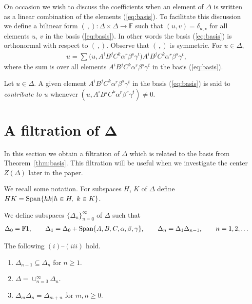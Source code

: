  On occasion we
wish to discuss the coef\/f\/icients
when an element of $\Delta$ is written as a linear
combination of the elements
(\ref{eq:basis}). To facilitate this discussion
we def\/ine a bilinear form
$(\,,) : \Delta \times \Delta \to \mathbb F$
such that $( u,v) = \delta_{u,v}$
for all elements $u$, $v$ in the basis
(\ref{eq:basis}). In other words
the basis
(\ref{eq:basis}) is
orthonormal with respect to
$( \,,) $.
 Observe that
$(\,,)$ is symmetric.
For $u \in \Delta$,
\begin{gather}
u = \sum \big(u, A^iB^jC^k\alpha^r\beta^s\gamma^t \big)
 A^iB^jC^k\alpha^r\beta^s\gamma^t,
\label{eq:bilsum}
\end{gather}
where the sum is over all elements
 $A^iB^jC^k\alpha^r\beta^s\gamma^t$ in the basis
(\ref{eq:basis}).

\begin{Definition}
\label{def:contrib}
\rm
Let $u \in \Delta $. A given element
 $A^iB^jC^k\alpha^r\beta^s\gamma^t$ in the basis
(\ref{eq:basis}) is said to
{\it contribute to
  $u$} whenever $(u,
 A^iB^jC^k\alpha^r\beta^s\gamma^t )
  \not=0$.
\end{Definition}







\section[A filtration of $\Delta$]{A f\/iltration of $\boldsymbol{\Delta}$}


In this section we obtain
a f\/iltration of $\Delta $
which
is related to the basis from Theorem~\ref{thm:basis}.
 This f\/iltration will be useful
when we investigate the center  $Z(\Delta)$ later in the paper.


We recall some notation.
For subspaces $H$, $K$ of $\Delta $ def\/ine
$HK={\rm Span}\lbrace hk | h \in H, \; k \in K\rbrace$.

\begin{Definition}
\label{def:ui}
We def\/ine subspaces
$\lbrace \Delta_n\rbrace_{n=0}^\infty$
of $\Delta $ such that
\begin{gather*}
\Delta_0=\mathbb F 1,
  \qquad
\Delta_1 =\Delta_0+{\rm Span}\lbrace A,B,C,\alpha,\beta,\gamma\rbrace,
 \qquad
\Delta_n=\Delta_1 \Delta_{n-1}, \qquad n=1,2,\ldots
\end{gather*}
\end{Definition}

\begin{Lemma}
\label{lem:filt}
The following $(i)$--$(iii)$ hold.
\begin{enumerate}\itemsep=0pt
\item[$(i)$]
 $\Delta_{n-1}\subseteq \Delta_n$ for  $n\geq 1$.
\item[$(ii)$]
$\Delta=\cup_{n=0}^\infty \Delta_n$.
\item[$(iii)$]
$\Delta_m \Delta_n = \Delta_{m+n} $ for
 $m,n\geq 0$.
\end{enumerate}
\end{Lemma}

